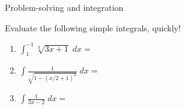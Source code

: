 \documentclass[../main.tex]{subfiles}
\begin{document}
\begin{lesson}{Problem-solving and integration}
  \begin{example}
    Evaluate the following simple integrals, quickly!

    \begin{enumerate}[wide]
      \item \(\int_{1}^{-1} \sqrt[3]{3x + 1} \;dx = \)
      \item \(\int \frac{1}{\sqrt{1 - (x/2 + 1)^2}} \;dx = \)
      \item \(\int \frac{1}{3x-2} \;dx = \)
    \end{enumerate}
  \end{example}
\end{lesson}
\end{document}
